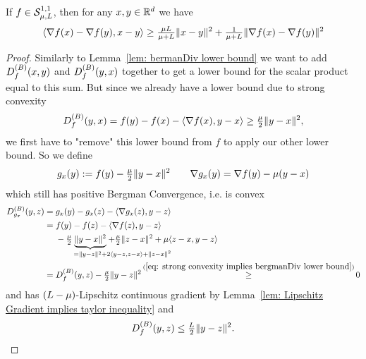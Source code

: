 \begin{lemma}
	\label{lem: bermanDiv lower bound (strongly convex)}
	If \(f\in\mathcal{S}^{1,1}_{{\mu},{L}}\), then for any
	\(x,y\in\mathbb{R}^d\) we have
	\begin{align*}
		\langle \nabla f(x) - \nabla f(y), x-y\rangle 
		\ge \tfrac{\mu L}{\mu+L} \| x-y\|^2
		+ \tfrac{1}{\mu+L}\|\nabla f(x) -\nabla f(y)\|^2
	\end{align*}
\end{lemma}
\begin{proof}
	Similarly to Lemma~\ref{lem: bermanDiv lower bound} we want to
	add \(D^{(B)}_{f}(x,y)\) and \(D^{(B)}_{f}(y,x)\) together to
	get a lower bound for the scalar product equal to this sum. But since we
	already have a lower bound due to strong convexity
	\begin{align}\label{eq: strong convexity implies bergmanDiv lower bound}
		D^{(B)}_{f}(y,x) = f(y) - f(x) -\langle\nabla f(x), y-x\rangle
		\ge \tfrac{\mu}2 \|y-x\|^2,
	\end{align}
	we first have to "remove" this lower bound from \(f\) to apply our other
	lower bound. So we define
	\begin{align*}
		g_x(y) := f(y) - \tfrac{\mu}2\|y-x\|^2 \qquad
		\nabla g_x(y) = \nabla f(y) - \mu(y-x)
	\end{align*}
	which still has positive Bergman Convergence, i.e. is convex
	\begin{align*}
		\bergmanDiv{g_x}(y,z)
		&= g_x(y) - g_x(z) - \langle\nabla g_x(z), y-z\rangle \\
		&= 
		\begin{aligned}[t]
			& f(y) - f(z) -\langle\nabla f(z), y-z\rangle \\
			&- \tfrac\lbound{2}\underbrace{\|y-x\|^2}_{
				=\|y-z\|^2 + \mathrlap{2\langle y-z, z-x\rangle + \|z-x\|^2}
			}
			+ \tfrac\lbound{2}\|z-x\|^2
			+ \lbound\langle z-x, y-z\rangle
		\end{aligned}\\
		&= \bergmanDiv{f}(y,z) - \tfrac{\lbound}2\|y-z\|^2
		\xge{(\ref{eq: strong convexity implies bergmanDiv lower bound})} 0
	\end{align*}
	and has \((L-\mu)\)-Lipschitz continuous gradient by
	Lemma~\ref{lem: Lipschitz Gradient implies taylor inequality} and 
	\begin{align}
		\label{eq: bergmanDiv upper bound}
		D^{(B)}_{f}(y,z) \le \tfrac{L}2\|y-z\|^2.
	\end{align}

\end{proof}
